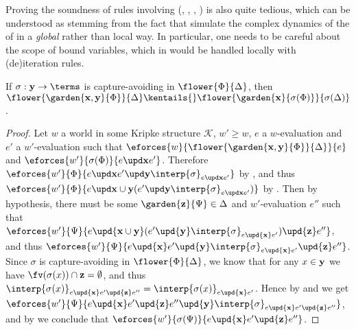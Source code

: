 \begin{scope}
Proving the soundness of rules involving  (, ,
, ) is also quite tedious, which can be understood as
stemming from the fact that  simulate the complex dynamics of the
 of  in a \emph{global} rather than local way. In particular,
one needs to be careful about the scope of bound variables, which in  would be
handled locally with (de)iteration rules.

\begin{lemma}
  
  If $\sigma : \by \to \terms$ is capture-avoiding in $\flower{\Phi}{\Delta}$,
  then $\flower{\garden{\bx, \by}{\Phi}}{\Delta} \kentails{}
  \flower{\garden{\bx}{\sigma(\Phi)}}{\sigma(\Delta)}$.
\end{lemma}
\begin{proof}
  Let $w$ a world in some Kripke structure $\mathcal{K}$, $w' \geq w$, $e$
  a $w$-evaluation and $e'$ a $w'$-evaluation such that
  $\eforces{w}{\flower{\garden{\bx,\by}{\Phi}}{\Delta}}{e}$ and
  $\eforces{w'}{\sigma(\Phi)}{\update{e}{\bx}{e'}}$. Therefore
  $\eforces{w'}{\Phi}{\update{e}{\bx}{\update{e'}{\by}{\interp{\sigma}_{\update{e}{\bx}{e'}}}}}$
  by , and thus $\eforces{w'}{\Phi}{\update{e}{\bx \cup
  \by}{(\update{e'}{\by}{\interp{\sigma}_{\update{e}{\bx}{e'}}})}}$ by
  . Then by hypothesis, there must be some
  $\garden{\bz}{\Psi} \in \Delta$ and $w'$-evaluation $e''$ such that
  $\eforces{w'}{\Psi}{e \upd{\bx \cup \by} (e' \upd{\by} \interp{\sigma}_{e
  \upd{\bx} e'}) \upd{\bz} e''}$, and thus $\eforces{w'}{\Psi}{e \upd{\bx} e'
  \upd{\by} \interp{\sigma}_{e \upd{\bx} e'} \upd{\bz} e''}$. Since $\sigma$ is
  capture-avoiding in $\flower{\Phi}{\Delta}$, we know that for any $x \in \mathbf{y}$
  we have $\fv(\sigma(x)) \cap \bz = \emptyset$, and thus $\interp{\sigma(x)}_{e
  \upd{\bx} e' \upd{\bz} e''} = \interp{\sigma(x)}_{e \upd{\bx} e'}$. Hence by
   and  we get $\eforces{w'}{\Psi}{e
  \upd{\bx} e' \upd{\bz} e'' \upd{\by} \interp{\sigma}_{e \upd{\bx} e' \upd{\bz}
  e''}}$, and by  we conclude that
  $\eforces{w'}{\sigma(\Psi)}{e \upd{\bx} e' \upd{\bz} e''}$.
\end{proof}

\begin{lemma}
  

\end{lemma}
\end{scope}
